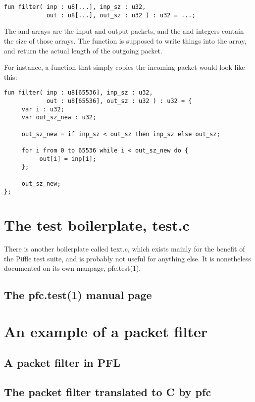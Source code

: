 \documentclass[a4paper,12pt]{scrreprt}
\begin{document}
\begin{verbatim}
fun filter( inp : u8[...], inp_sz : u32, 
            out : u8[...], out_sz : u32 ) : u32 = ...;
\end{verbatim}

The  and  arrays are the input and output packets,
and the  and  integers contain the size of
those arrays. The function is supposed to write things into the
 array, and return the actual length of the outgoing packet.

For instance, a  function that simply copies the incoming
packet would look like this:

\begin{verbatim}
fun filter( inp : u8[65536], inp_sz : u32, 
            out : u8[65536], out_sz : u32 ) : u32 = {
     var i : u32;
     var out_sz_new : u32;

     out_sz_new = if inp_sz < out_sz then inp_sz else out_sz;

     for i from 0 to 65536 while i < out_sz_new do {
          out[i] = inp[i];
     };

     out_sz_new;
};
\end{verbatim}


\chapter{The test boilerplate, test.c}

There is another boilerplate called text.c, which exists mainly for
the benefit of the Piffle test suite, and is probably not useful for
anything else. It is nonetheless documented on its own manpage,
pfc.test(1).

\section{The pfc.test(1) manual page}


\chapter{An example of a packet filter}

\section{A packet filter in PFL}


\newpage
\section{The packet filter translated to C by pfc}



\end{document}
